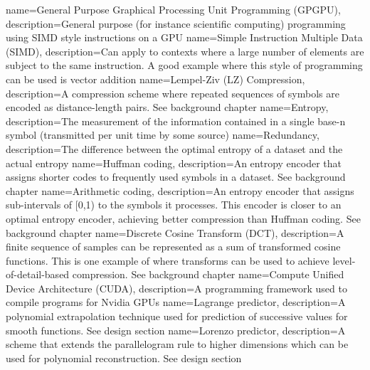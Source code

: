  {
  name={General Purpose Graphical Processing Unit Programming (GPGPU)},
  description={General purpose (for instance scientific computing) programming using SIMD style instructions on a GPU}
 }
 {
  name={Simple Instruction Multiple Data (SIMD)},
  description={Can apply to contexts where a large number of elements are subject to the same instruction. A good example where this style of programming
  can be used is vector addition}
 }
 {
  name={Lempel-Ziv (LZ) Compression},
  description={A compression scheme where repeated sequences of symbols are encoded as distance-length pairs. See background chapter}
 }
 {
  name={Entropy},
  description={The measurement of the information contained in a single base-n symbol (transmitted per unit time by some source)}
 }
 {
  name={Redundancy},
  description={The difference between the optimal entropy of a dataset and the actual entropy}
 }
 {
  name={Huffman coding},
  description={An entropy encoder that assigns shorter codes to frequently used symbols in a dataset. See background chapter}
 }
 {
  name={Arithmetic coding},
  description={An entropy encoder that assigns sub-intervals of [0,1) to the symbols it processes. This encoder is closer to an optimal entropy encoder, achieving better compression than 
  Huffman coding. See background chapter}
 }
 {
  name={Discrete Cosine Transform (DCT)},
  description={A finite sequence of samples can be represented as a sum of transformed cosine functions. This is one example of where transforms can be used to
  achieve level-of-detail-based compression. See background chapter}
 }
 {
  name={Compute Unified Device Architecture (CUDA)},
  description={A programming framework used to compile programs for Nvidia GPUs}
 } 
 {
  name={Lagrange predictor},
  description={A polynomial extrapolation technique used for prediction of successive values for smooth functions. See design section}
 } 
 {
  name={Lorenzo predictor},
  description={A scheme that extends the parallelogram rule to higher dimensions which can be used for polynomial reconstruction. See design section}
 } 
